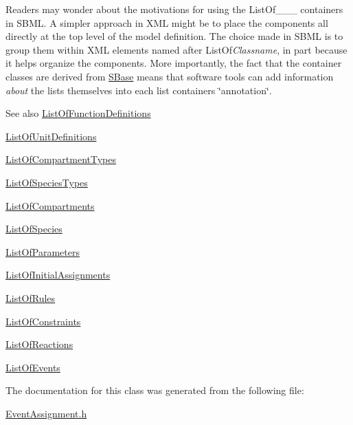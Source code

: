 Readers may wonder about the motivations for using the List\+Of\+\_\+\+\_\+\+\_\+ containers in S\+B\+ML. A simpler approach in X\+ML might be to place the components all directly at the top level of the model definition. The choice made in S\+B\+ML is to group them within X\+ML elements named after List\+Of{\itshape Classname}, in part because it helps organize the components. More importantly, the fact that the container classes are derived from \hyperlink{class_s_base}{S\+Base} means that software tools can add information {\itshape about} the lists themselves into each list container\textquotesingle{}s \char`\"{}annotation\char`\"{}.

\begin{DoxySeeAlso}{See also}
\hyperlink{class_list_of_function_definitions}{List\+Of\+Function\+Definitions} 

\hyperlink{class_list_of_unit_definitions}{List\+Of\+Unit\+Definitions} 

\hyperlink{class_list_of_compartment_types}{List\+Of\+Compartment\+Types} 

\hyperlink{class_list_of_species_types}{List\+Of\+Species\+Types} 

\hyperlink{class_list_of_compartments}{List\+Of\+Compartments} 

\hyperlink{class_list_of_species}{List\+Of\+Species} 

\hyperlink{class_list_of_parameters}{List\+Of\+Parameters} 

\hyperlink{class_list_of_initial_assignments}{List\+Of\+Initial\+Assignments} 

\hyperlink{class_list_of_rules}{List\+Of\+Rules} 

\hyperlink{class_list_of_constraints}{List\+Of\+Constraints} 

\hyperlink{class_list_of_reactions}{List\+Of\+Reactions} 

\hyperlink{class_list_of_events}{List\+Of\+Events} 
\end{DoxySeeAlso}


The documentation for this class was generated from the following file\+:\begin{DoxyCompactItemize}
\item 
\hyperlink{_event_assignment_8h}{Event\+Assignment.\+h}\end{DoxyCompactItemize}
